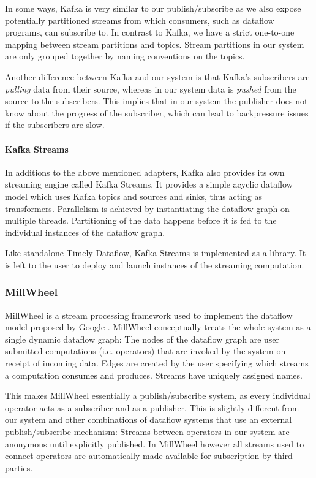 In some ways, Kafka is very similar to our publish/subscribe as we also expose
potentially partitioned streams from which consumers, such as dataflow programs,
can subscribe to. In contrast to Kafka, we have a strict one-to-one mapping between stream
partitions and topics. Stream partitions in our system are only grouped together
by naming conventions on the topics.
 
Another difference between Kafka and our system is that Kafka's subscribers are
\emph{pulling} data from their source, whereas in our system data is \emph{pushed}
from the source to the subscribers. This implies that in our system the publisher
does not know about the progress of the subscriber, which can lead
to backpressure issues if the subscribers are slow.

\paragraph{Kafka Streams}
In additions to the above mentioned adapters, Kafka also provides its own
streaming engine called Kafka Streams. It provides a simple acyclic dataflow
model which uses Kafka topics and sources and sinks, thus acting as transformers.
Parallelism is achieved by instantiating the dataflow graph on multiple threads.
Partitioning of the data happens before it is fed to the individual instances
of the dataflow graph.

Like standalone Timely Dataflow, Kafka Streams is implemented as a library. It
is left to the user to deploy and launch instances of the streaming computation.

\subsubsection{MillWheel}

MillWheel \cite{millwheel} is a stream processing framework used to implement
the dataflow model proposed by Google \cite{google}. MillWheel conceptually
treats the whole system as a single dynamic dataflow graph: The nodes of the
dataflow graph are user submitted computations (i.e. operators) that are
invoked by the system on receipt of incoming data. Edges are created by the
user specifying which streams a computation consumes and produces. Streams
have uniquely assigned names.

This makes MillWheel essentially a publish/subscribe system, as every individual
operator acts as a subscriber and as a publisher. This is slightly different from
our system and other combinations of dataflow systems that use an external
publish/subscribe mechanism: Streams between operators in our system are anonymous until
explicitly published. In MillWheel however all streams used to connect operators
are automatically made available for subscription by third parties.

